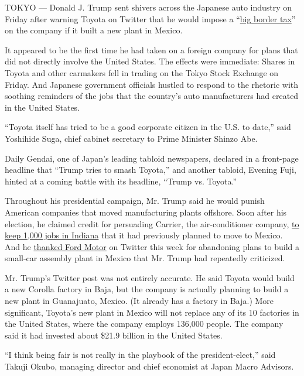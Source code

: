 TOKYO --- Donald J. Trump sent shivers across the Japanese auto industry
on Friday after warning Toyota on Twitter that he would impose a
``\href{https://twitter.com/realDonaldTrump/status/817071792711942145}{big
border tax}'' on the company if it built a new plant in Mexico.

It appeared to be the first time he had taken on a foreign company for
plans that did not directly involve the United States. The effects were
immediate: Shares in Toyota and other carmakers fell in trading on the
Tokyo Stock Exchange on Friday. And Japanese government officials
hustled to respond to the rhetoric with soothing reminders of the jobs
that the country's auto manufacturers had created in the United States.

``Toyota itself has tried to be a good corporate citizen in the U.S. to
date,'' said Yoshihide Suga, chief cabinet secretary to Prime Minister
Shinzo Abe.

Daily Gendai, one of Japan's leading tabloid newspapers, declared in a
front-page headline that ``Trump tries to smash Toyota,'' and another
tabloid, Evening Fuji, hinted at a coming battle with its headline,
``Trump vs. Toyota.''

Throughout his presidential campaign, Mr. Trump said he would punish
American companies that moved manufacturing plants offshore. Soon after
his election, he claimed credit for persuading Carrier, the
air-conditioner company,
\href{https://www.nytimes.com/2016/11/29/business/trump-to-announce-carrier-plant-will-keep-jobs-in-us.html?_r=0}{to
keep 1,000 jobs in Indiana} that it had previously planned to move to
Mexico. And he
\href{https://twitter.com/realDonaldTrump/status/816635078067490816}{thanked
Ford Motor} on Twitter this week for abandoning plans to build a
small-car assembly plant in Mexico that Mr. Trump had repeatedly
criticized.

Mr. Trump's Twitter post was not entirely accurate. He said Toyota would
build a new Corolla factory in Baja, but the company is actually
planning to build a new plant in Guanajuato, Mexico. (It already has a
factory in Baja.) More significant, Toyota's new plant in Mexico will
not replace any of its 10 factories in the United States, where the
company employs 136,000 people. The company said it had invested about
\$21.9 billion in the United States.

``I think being fair is not really in the playbook of the
president-elect,'' said Takuji Okubo, managing director and chief
economist at Japan Macro Advisors.

